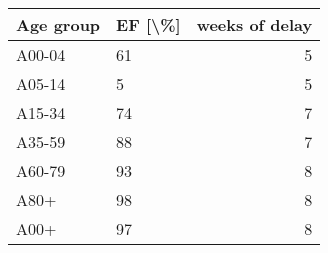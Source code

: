 \begin{tabular}{llr}
\toprule
Age group & EF [\textbackslash \%] &  weeks of delay \\
\midrule
   A00-04 &      61 &               5 \\
   A05-14 &       5 &               5 \\
   A15-34 &      74 &               7 \\
   A35-59 &      88 &               7 \\
   A60-79 &      93 &               8 \\
     A80+ &      98 &               8 \\
     A00+ &      97 &               8 \\
\bottomrule
\end{tabular}
